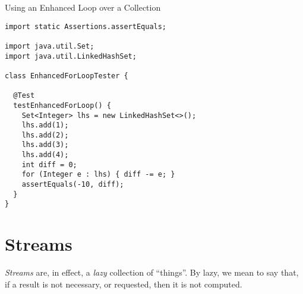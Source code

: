 
\begin{cl}[]{Using an Enhanced  Loop over a Collection}
\begin{lstlisting}[language=MyJava]
import static Assertions.assertEquals;

import java.util.Set;
import java.util.LinkedHashSet;

class EnhancedForLoopTester {

  @Test
  testEnhancedForLoop() {
    Set<Integer> lhs = new LinkedHashSet<>();
    lhs.add(1);
    lhs.add(2);
    lhs.add(3);
    lhs.add(4);
    int diff = 0;
    for (Integer e : lhs) { diff -= e; }
    assertEquals(-10, diff);
  }
}
\end{lstlisting}
\end{cl}

\section*{Streams}
\textit{Streams} are, in effect, a \textit{lazy} collection of ``things''. By lazy, we mean to say that, if a result is not necessary, or requested, then it is not computed.

